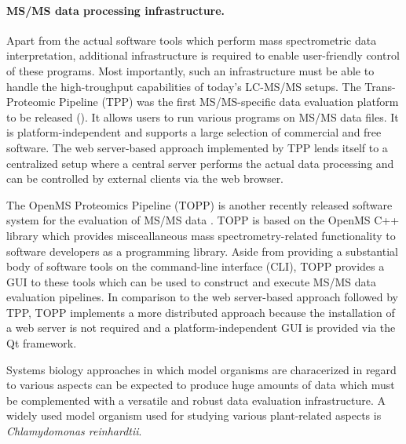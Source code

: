 \paragraph{MS/MS data processing infrastructure.}

Apart from the actual software tools which perform mass spectrometric data 
interpretation, additional infrastructure is required to enable user-friendly 
control of these programs.
Most importantly, such an infrastructure must be able to handle the 
high-troughput capabilities of today's LC-MS/MS setups.
The Trans-Proteomic Pipeline (TPP) was the first MS/MS-specific data evaluation 
platform to be released (\cite{Keller2005}).
It allows users to run various programs on MS/MS data files.
It is platform-independent and supports a large selection of commercial and
free software.
The web server-based approach implemented by TPP lends itself to a centralized
setup where a central server performs the actual data processing and can
be controlled by external clients via the web browser.

The OpenMS Proteomics Pipeline (TOPP) is another recently released software 
system for the evaluation of MS/MS data \citep{Kohlbacher2007}.
TOPP is based on the OpenMS C++ library which provides misceallaneous mass 
spectrometry-related functionality to software developers as a programming 
library.
Aside from providing a substantial body of software tools on the command-line 
interface (CLI), TOPP provides a GUI to these tools which can be used to
construct and execute MS/MS data evaluation pipelines.
In comparison to the web server-based approach followed by TPP, TOPP implements
a more distributed approach because the installation of a web server is not
required and a platform-independent GUI is provided via the Qt framework.

Systems biology approaches in which model organisms are characerized in
regard to various aspects can be expected to produce huge amounts of data 
which must be complemented with a versatile and robust data evaluation 
infrastructure.
A widely used model organism used for studying various plant-related
aspects is {\em Chlamydomonas reinhardtii}.

